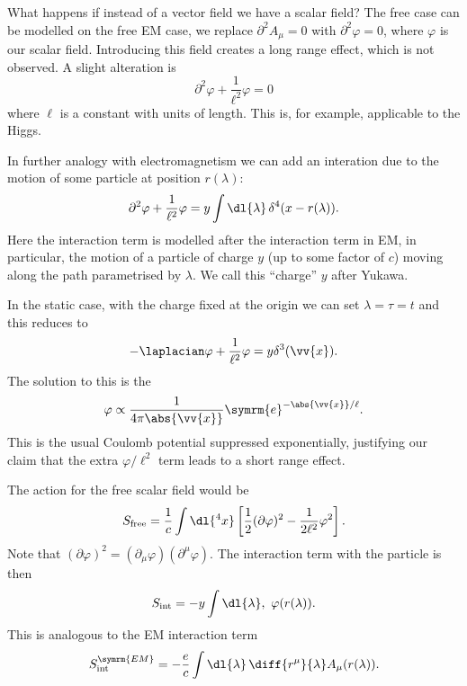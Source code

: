\documentclass[fleqn]{NotesClass}
\newcommand*{\dalembertian}{\partial^2}
\newcommand*{\e}{\symrm{e}}
\begin{document}
    What happens if instead of a vector field we have a scalar field?
    The free case can be modelled on the free EM case, we replace \(\dalembertian A_\mu = 0\) with \(\dalembertian \varphi = 0\), where \(\varphi\) is our scalar field.
    Introducing this field creates a long range effect, which is not observed.
    A slight alteration is
    \begin{equation}
        \dalembertian \varphi + \frac{1}{\ell^2} \varphi = 0
    \end{equation}
    where \(\ell\) is a constant with units of length.
    This is, for example, applicable to the Higgs.
    
    In further analogy with electromagnetism we can add an interation due to the motion of some particle at position \(r(\lambda)\):
    \begin{equation}
        \dalembertian \varphi + \frac{1}{\ell^2}\varphi = y\int \dl{\lambda} \, \delta^4(x - r(\lambda)).
    \end{equation}
    Here the interaction term is modelled after the interaction term in EM, in particular, the motion of a particle of charge \(y\) (up to some factor of \(c\)) moving along the path parametrised by \(\lambda\).
    We call this \enquote{charge} \(y\) after Yukawa.
    
    In the static case, with the charge fixed at the origin we can set \(\lambda = \tau = t\) and this reduces to
    \begin{equation}
        -\laplacian\varphi + \frac{1}{\ell^2}\varphi = y\delta^3(\vv{x}).
    \end{equation}
    The solution to this is the 
    \begin{equation}
        \varphi \propto \frac{1}{4\pi \abs{\vv{x}}} \e^{-\abs{\vv{x}}/\ell}.
    \end{equation}
    This is the usual Coulomb potential suppressed exponentially, justifying our claim that the extra \(\varphi/\ell^2\) term leads to a short range effect.
    
    The action for the free scalar field would be
    \begin{equation}
        S_{\text{free}} = \frac{1}{c} \int \dl{^4x} \left[ \frac{1}{2}(\partial \varphi)^2 - \frac{1}{2\ell^2}\varphi^2 \right].
    \end{equation}
    Note that \((\partial\varphi)^2 = (\partial_\mu \varphi)(\partial^\mu \varphi)\).
    The interaction term with the particle is then
    \begin{equation}
        S_{\text{int}} = -y\int \dl{\lambda} ,\ \varphi(r(\lambda)).
    \end{equation}
    This is analogous to the EM interaction term
    \begin{equation}
        S_{\text{int}}^{\symrm{EM}} = -\frac{e}{c} \int \dl{\lambda} \, \diff{r^\mu}{\lambda} A_\mu (r(\lambda)).
    \end{equation}
    
\end{document}
